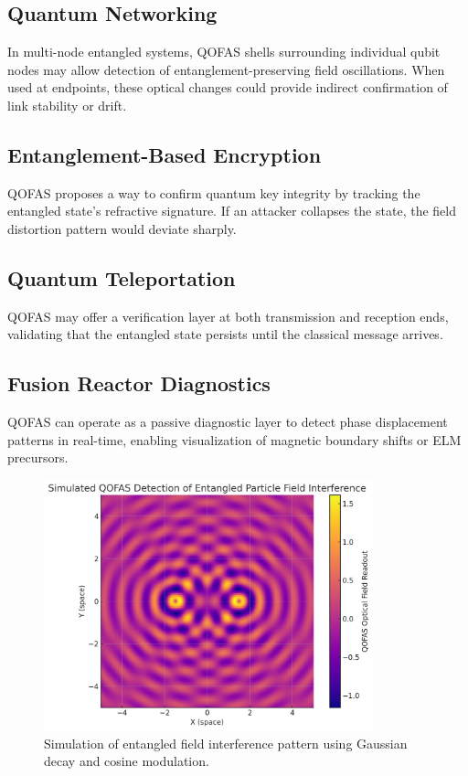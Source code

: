 \documentclass[11pt]{article}
\begin{document}
\subsection{Quantum Networking}
In multi-node entangled systems, QOFAS shells surrounding individual qubit nodes may allow detection of entanglement-preserving field oscillations. When used at endpoints, these optical changes could provide indirect confirmation of link stability or drift.

\subsection{Entanglement-Based Encryption}
QOFAS proposes a way to confirm quantum key integrity by tracking the entangled state’s refractive signature. If an attacker collapses the state, the field distortion pattern would deviate sharply.

\subsection{Quantum Teleportation}
QOFAS may offer a verification layer at both transmission and reception ends, validating that the entangled state persists until the classical message arrives.

\subsection{Fusion Reactor Diagnostics}
QOFAS can operate as a passive diagnostic layer to detect phase displacement patterns in real-time, enabling visualization of magnetic boundary shifts or ELM precursors.

\begin{figure}[h!]
  \centering
  \includegraphics[width=0.85\textwidth]{images/entanglement_field_simulation.png}
  \caption{Simulation of entangled field interference pattern using Gaussian decay and cosine modulation.}
  \label{fig:entanglement_simulation}
\end{figure}
\end{document}
